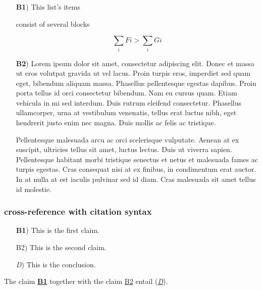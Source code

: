 \documentclass[
]{article}
\providecommand{\tightlist}{%
  \setlength{\itemsep}{0pt}\setlength{\parskip}{0pt}}
\begin{document}
\begin{itemize}
\tightlist

\item[\textbf{B1})] This list's items

consist of several blocks

\[\sum_i Fi > \sum_i Gi\]

\item[\textbf{B2})] Lorem ipsum dolor sit amet, consectetur adipiscing
elit. Donec et massa ut eros volutpat gravida ut vel lacus. Proin turpis
eros, imperdiet sed quam eget, bibendum aliquam massa. Phasellus
pellentesque egestas dapibus. Proin porta tellus id orci consectetur
bibendum. Nam eu cursus quam. Etiam vehicula in mi sed interdum. Duis
rutrum eleifend consectetur. Phasellus ullamcorper, urna at vestibulum
venenatis, tellus erat luctus nibh, eget hendrerit justo enim nec magna.
Duis mollis ac felis ac tristique.

Pellentesque malesuada arcu ac orci scelerisque vulputate. Aenean at ex
suscipit, ultricies tellus sit amet, luctus lectus. Duis ut viverra
sapien. Pellentesque habitant morbi tristique senectus et netus et
malesuada fames ac turpis egestas. Cras consequat nisi at ex finibus, in
condimentum erat auctor. In at nulla at est iaculis pulvinar sed id
diam. Cras malesuada sit amet tellus id molestie.

\end{itemize}

\hypertarget{cross-reference-with-citation-syntax}{%
\subsubsection{cross-reference with citation
syntax}\label{cross-reference-with-citation-syntax}}

\begin{itemize}
\tightlist

\item[\textbf{B1})]\protect\hypertarget{B1ref}{}{} This is the first
claim.

\item[B2)]\protect\hypertarget{B2ref}{}{} This is the second claim.

\item[\emph{D})]\protect\hypertarget{Dref}{}{} This is the conclusion.

\end{itemize}

The claim \protect\hyperlink{B1ref}{\textbf{B1}} together with the claim
\protect\hyperlink{B2ref}{B2} entail
(\protect\hyperlink{Dref}{\emph{D}}).
\end{document}
